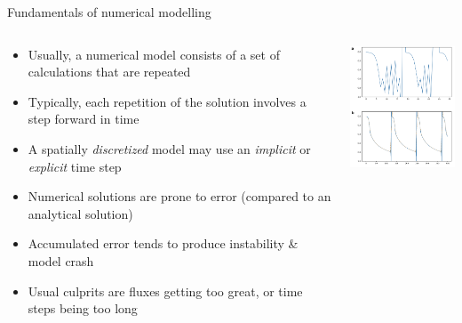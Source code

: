 \begin{frame}{\insertsectionnumber{ |} Fundamentals of numerical modelling}


\begin{columns}

\column[c]{6cm}

\begin{beamerboxesrounded}[lower=gray,shadow=true]{
\begin{itemize}
\item Usually, a numerical model consists of a set of calculations that are repeated
\item Typically, each repetition of the solution involves a step forward in time
\item A spatially \emph{discretized} model may use an \emph{implicit} or \emph{explicit} time step
\item Numerical solutions are prone to error (compared to an analytical solution)
\item Accumulated error tends to produce instability \& model crash
\item Usual culprits are fluxes getting too great, or time steps being too long
\end{itemize}
}
\end{beamerboxesrounded}

\column[c]{4.5cm}
\includegraphics[width=4.25cm]{images/PP-sensitivity.png}

\end{columns}


\end{frame}




